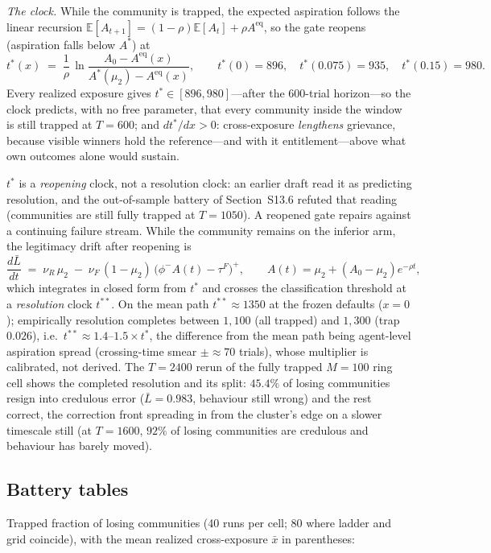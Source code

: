 \documentclass[11pt]{article}
\newcommand{\1}{\mathbf{1}}
\newcommand{\Astar}{A^{*}}
\begin{document}
\emph{The clock.} While the community is trapped, the expected aspiration follows the linear recursion $\mathbb{E}[A_{t+1}]=(1-\rho)\mathbb{E}[A_t]+\rho A^{\mathrm{eq}}$, so the gate reopens (aspiration falls below $\Astar$) at
\[
t^{*}(x)\;=\;\frac{1}{\rho}\,\ln\!\frac{A_0-A^{\mathrm{eq}}(x)}{\Astar(\mu_2)-A^{\mathrm{eq}}(x)},
\qquad
t^{*}(0)=896,\quad t^{*}(0.075)=935,\quad t^{*}(0.15)=980.
\]
Every realized exposure gives $t^{*}\in[896,980]$---after the 600-trial horizon---so the clock predicts, with no free parameter, that every community inside the window is still trapped at $T=600$; and $dt^{*}/dx>0$: cross-exposure \emph{lengthens} grievance, because visible winners hold the reference---and with it entitlement---above what own outcomes alone would sustain.

$t^{*}$ is a \emph{reopening} clock, not a resolution clock: an earlier draft read it as predicting resolution, and the out-of-sample battery of Section~S13.6 refuted that reading (communities are still fully trapped at $T=1050$). A reopened gate repairs against a continuing failure stream. While the community remains on the inferior arm, the legitimacy drift after reopening is
\[
\frac{d\bar L}{dt} \;=\; \nu_R\,\mu_2 \;-\; \nu_F\,(1-\mu_2)\,\bigl(\phi^-A(t)-\tau^F\bigr)^{+},
\qquad A(t)=\mu_2+(A_0-\mu_2)e^{-\rho t},
\]
which integrates in closed form from $t^{*}$ and crosses the classification threshold at a \emph{resolution} clock $t^{**}$. On the mean path $t^{**}\approx1350$ at the frozen defaults ($x=0$); empirically resolution completes between $1{,}100$ (all trapped) and $1{,}300$ (trap $0.026$), i.e.\ $t^{**}\approx1.4$--$1.5\times t^{*}$, the difference from the mean path being agent-level aspiration spread (crossing-time smear $\pm\approx70$ trials), whose multiplier is calibrated, not derived. The $T=2400$ rerun of the fully trapped $M=100$ ring cell shows the completed resolution and its split: $45.4\%$ of losing communities resign into credulous error ($\bar L=0.983$, behaviour still wrong) and the rest correct, the correction front spreading in from the cluster's edge on a slower timescale still (at $T=1600$, $92\%$ of losing communities are credulous and behaviour has barely moved).

\subsection{Battery tables}
Trapped fraction of losing communities (40 runs per cell; 80 where ladder and grid coincide), with the mean realized cross-exposure $\bar x$ in parentheses:
\end{document}
